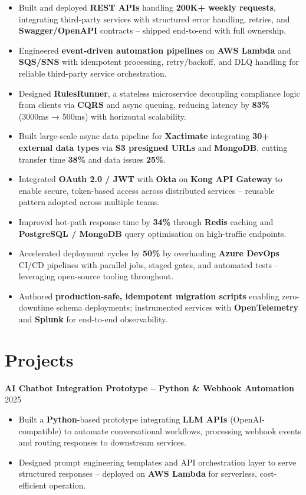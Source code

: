 \documentclass[letterpaper,10pt]{article}
\begin{document}
\begin{itemize}[leftmargin=*]
    \item Built and deployed \textbf{REST APIs} handling \textbf{200K+ weekly requests}, integrating third-party services with structured error handling, retries, and \textbf{Swagger/OpenAPI} contracts -- shipped end-to-end with full ownership.
    \item Engineered \textbf{event-driven automation pipelines} on \textbf{AWS Lambda} and \textbf{SQS/SNS} with idempotent processing, retry/backoff, and DLQ handling for reliable third-party service orchestration.
    \item Designed \textbf{RulesRunner}, a stateless microservice decoupling compliance logic from clients via \textbf{CQRS} and async queuing, reducing latency by \textbf{83\%} (3000ms → 500ms) with horizontal scalability.
    \item Built large-scale async data pipeline for \textbf{Xactimate} integrating \textbf{30+ external data types} via \textbf{S3 presigned URLs} and \textbf{MongoDB}, cutting transfer time \textbf{38\%} and data issues \textbf{25\%}.
    \item Integrated \textbf{OAuth 2.0 / JWT} with \textbf{Okta} on \textbf{Kong API Gateway} to enable secure, token-based access across distributed services -- reusable pattern adopted across multiple teams.
    \item Improved hot-path response time by \textbf{34\%} through \textbf{Redis} caching and \textbf{PostgreSQL / MongoDB} query optimisation on high-traffic endpoints.
    \item Accelerated deployment cycles by \textbf{50\%} by overhauling \textbf{Azure DevOps} CI/CD pipelines with parallel jobs, staged gates, and automated tests -- leveraging open-source tooling throughout.
    \item Authored \textbf{production-safe, idempotent migration scripts} enabling zero-downtime schema deployments; instrumented services with \textbf{OpenTelemetry} and \textbf{Splunk} for end-to-end observability.
\end{itemize}

\section*{Projects}

\textbf{AI Chatbot Integration Prototype -- Python \& Webhook Automation} \hfill 2025
\begin{itemize}[leftmargin=*]
    \item Built a \textbf{Python}-based prototype integrating \textbf{LLM APIs} (OpenAI-compatible) to automate conversational workflows, processing webhook events and routing responses to downstream services.
    \item Designed prompt engineering templates and API orchestration layer to serve structured responses -- deployed on \textbf{AWS Lambda} for serverless, cost-efficient operation.
\end{itemize}
\end{document}
